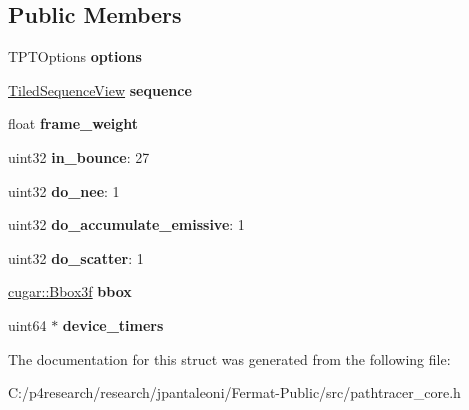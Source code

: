 \subsection*{Public Members}
\begin{DoxyCompactItemize}
\item 
\mbox{\label{struct_p_t_context_base_a70b808eab602e21b27cf67b519e616dd}} 
T\+P\+T\+Options {\bfseries options}
\item 
\mbox{\label{struct_p_t_context_base_ad87b544af53094b069b007a9c0d68ecc}} 
\hyperlink{struct_tiled_sequence_view}{Tiled\+Sequence\+View} {\bfseries sequence}
\item 
\mbox{\label{struct_p_t_context_base_adb0b0071f2336f5b41db4ebe4a1d48a1}} 
float {\bfseries frame\+\_\+weight}
\item 
\mbox{\label{struct_p_t_context_base_ab759850126aab96f2c215e3e7fe61151}} 
uint32 {\bfseries in\+\_\+bounce}\+: 27
\item 
\mbox{\label{struct_p_t_context_base_a8339635970126472018781c5d25d4412}} 
uint32 {\bfseries do\+\_\+nee}\+: 1
\item 
\mbox{\label{struct_p_t_context_base_a6270ce4a44a00205e0e9cdc1dd1075de}} 
uint32 {\bfseries do\+\_\+accumulate\+\_\+emissive}\+: 1
\item 
\mbox{\label{struct_p_t_context_base_a6db8a60c17a4198e6c0e98f0d1c7309e}} 
uint32 {\bfseries do\+\_\+scatter}\+: 1
\item 
\mbox{\label{struct_p_t_context_base_aaa058c3adb68d3c3dfd87253b6dff411}} 
\hyperlink{structcugar_1_1_bbox}{cugar\+::\+Bbox3f} {\bfseries bbox}
\item 
\mbox{\label{struct_p_t_context_base_ac90bd20a8a832a442402cff3eb15df35}} 
uint64 $\ast$ {\bfseries device\+\_\+timers}
\end{DoxyCompactItemize}


The documentation for this struct was generated from the following file\+:\begin{DoxyCompactItemize}
\item 
C\+:/p4research/research/jpantaleoni/\+Fermat-\/\+Public/src/pathtracer\+\_\+core.\+h\end{DoxyCompactItemize}
